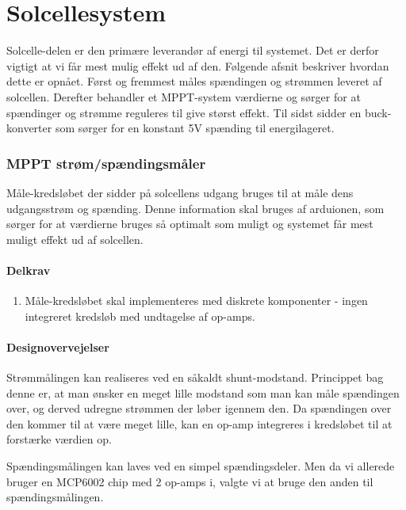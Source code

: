 \documentclass[../main.tex]{subfiles}
\begin{document}
\chapter{Solcellesystem} \label{Chap:Solcellesystem}
Solcelle-delen er den primære leverandør af energi til systemet. Det er derfor vigtigt at vi får mest mulig effekt ud af den. Følgende afsnit beskriver hvordan dette er opnået. Først og fremmest måles spændingen og strømmen leveret af solcellen. Derefter behandler et MPPT-system værdierne og sørger for at spændinger og strømme reguleres til give størst effekt. Til sidst sidder en buck-konverter som sørger for en konstant 5V spænding til energilageret.

\subsection{MPPT strøm/spændingsmåler}
    Måle-kredsløbet der sidder på solcellens udgang bruges til at måle dens udgangsstrøm og spænding. Denne information skal bruges af arduionen, som sørger for at værdierne bruges så optimalt som muligt og systemet får mest muligt effekt ud af solcellen.
            
        \subsubsection{Delkrav}

        \begin{enumerate}
                \item Måle-kredsløbet skal implementeres med diskrete komponenter - ingen integreret kredsløb med undtagelse af op-amps.
        \end{enumerate}
        
        \subsubsection{Designovervejelser}
        Strømmålingen kan realiseres ved en såkaldt shunt-modstand. Princippet bag denne er, at man ønsker en meget lille modstand som man kan måle spændingen over, og derved udregne strømmen der løber igennem den. Da spændingen over den kommer til at være meget lille, kan en op-amp integreres i kredsløbet til at forstærke værdien op.

        Spændingsmålingen kan laves ved en simpel spændingsdeler. Men da vi allerede bruger en MCP6002 chip med 2 op-amps i, valgte vi at bruge den anden til spændingsmålingen.
            
\end{document}
